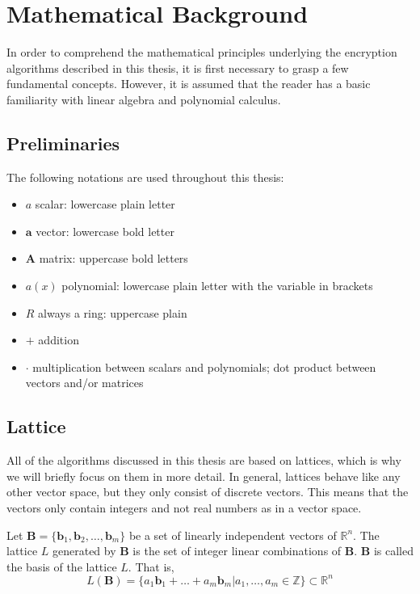 \chapter{Mathematical Background}
\label{MathBack}

In order to comprehend the mathematical principles underlying the encryption algorithms described in this thesis, it is first necessary to grasp a few fundamental concepts. However, it is assumed that the reader has a basic familiarity with linear algebra and polynomial calculus.

\section{Preliminaries}

The following notations are used throughout this thesis:

\begin{itemize}[label=$ $]
  \item $a$ \leftarrow scalar: lowercase plain letter
  \item $\textbf{a}$ \leftarrow vector: lowercase bold letter
  \item $\textbf{A}$ \leftarrow matrix: uppercase bold letters
  \item $a(x)$ \leftarrow polynomial: lowercase plain letter with the variable in brackets
  \item $R$ \leftarrow always a ring: uppercase plain
  \item $+$ \leftarrow addition
  \item $\cdot$ \leftarrow multiplication between scalars and polynomials; dot product between vectors and/or matrices
\end{itemize}

\section{Lattice}


All of the algorithms discussed in this thesis are based on lattices, which is why we will briefly focus on them in more detail. In general, lattices behave like any other vector space, but they only consist of discrete vectors. This means that the vectors only contain integers and not real numbers as in a vector space.

Let $\textbf{B} = \{\textbf{b}_1, \textbf{b}_2, \ldots, \textbf{b}_m\}$ be a set of linearly independent vectors of $\mathbb{R}^n$. The lattice $\textit{L}$ generated by $\textbf{B}$ is the set of integer linear combinations of $\textbf{B}$. $\textbf{B}$ is called the basis of the lattice $\textit{L}$. That is,
$$L(\textbf{B}) = \{a_1\textbf{b}_1 + \ldots + a_m\textbf{b}_m | a_1, \ldots, a_m \in \mathbb{Z}  \} \subset \mathbb{R}^n$$


